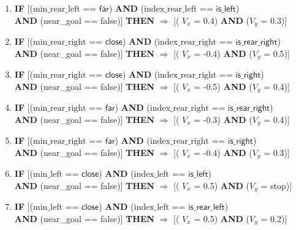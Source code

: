 \begin{enumerate}
	\item \textbf{IF} [($\text{min\_rear\_left}$ == $\textsf{far}$) \textbf{AND} ($\text{index\_rear\_left}$ == $\textsf{is\_left}$)\\
	\textbf{AND} (near\_goal == \textsf{false})]
	\textbf{THEN} $\Rightarrow$ [( $V_x$ = \textsf{0.4}) \textbf{AND} ($V_y$ = \textsf{0.3})]

	\item \textbf{IF} [($\text{min\_rear\_right}$ == $\textsf{close}$) \textbf{AND} ($\text{index\_rear\_right}$ == $\textsf{is\_rear\_right}$)\\
	\textbf{AND} (near\_goal == \textsf{false})]
	\textbf{THEN} $\Rightarrow$ [( $V_x$ = \textsf{-0.4}) \textbf{AND} ($V_y$ = \textsf{0.5})]	
	
	\item \textbf{IF} [($\text{min\_rear\_right}$ == $\textsf{close}$) \textbf{AND} ($\text{index\_rear\_right}$ == $\textsf{is\_right}$)\\
	\textbf{AND} (near\_goal == \textsf{false})]
	\textbf{THEN} $\Rightarrow$ [( $V_x$ = \textsf{-0.5}) \textbf{AND} ($V_y$ = \textsf{0.4})]
	
	\item \textbf{IF} [($\text{min\_rear\_right}$ == $\textsf{far}$) \textbf{AND} ($\text{index\_rear\_right}$ == $\textsf{is\_rear\_right}$)\\
	\textbf{AND} (near\_goal == \textsf{false})]
	\textbf{THEN} $\Rightarrow$ [( $V_x$ = \textsf{-0.3}) \textbf{AND} ($V_y$ = \textsf{0.4})]
	
	\item \textbf{IF} [($\text{min\_rear\_right}$ == $\textsf{far}$) \textbf{AND} ($\text{index\_rear\_right}$ == $\textsf{is\_right}$)\\
	\textbf{AND} (near\_goal == \textsf{false})]
	\textbf{THEN} $\Rightarrow$ [( $V_x$ = \textsf{-0.4}) \textbf{AND} ($V_y$ = \textsf{0.3})]
	
	\item \textbf{IF} [($\text{min\_left}$ == $\textsf{close}$) \textbf{AND} ($\text{index\_left}$ == $\textsf{is\_left}$)\\
	\textbf{AND} (near\_goal == \textsf{false})]
	\textbf{THEN} $\Rightarrow$ [( $V_x$ = \textsf{0.5}) \textbf{AND} ($V_y$ = \textsf{stop})]
	
	\item \textbf{IF} [($\text{min\_left}$ == $\textsf{close}$) \textbf{AND} ($\text{index\_left}$ == $\textsf{is\_rear\_left}$)\\
	\textbf{AND} (near\_goal == \textsf{false})]
	\textbf{THEN} $\Rightarrow$ [( $V_x$ = \textsf{0.5}) \textbf{AND} ($V_y$ = \textsf{0.2})]
	

\end{enumerate}
